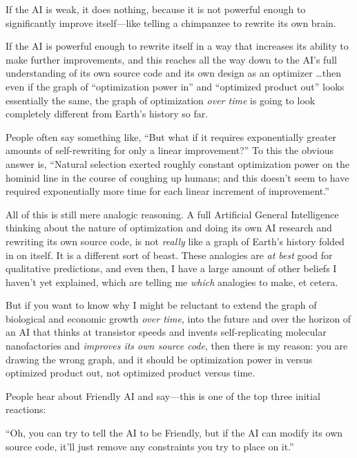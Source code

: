 {
 If the AI is weak, it does nothing, because it is not powerful
enough to significantly improve itself---like telling a chimpanzee to
rewrite its own brain.}

{
 If the AI is powerful enough to rewrite itself in a way that
increases its ability to make further improvements, and this reaches
all the way down to the AI's full understanding of its
own source code and its own design as an optimizer \ldots then even if
the graph of ``optimization power
in'' and ``optimized product
out'' looks essentially the same, the graph of
optimization \textit{over time} is going to look completely different
from Earth's history so far.}

{
 People often say something like, ``But what if it
requires exponentially greater amounts of self-rewriting for only a
linear improvement?'' To this the obvious answer is,
``Natural selection exerted roughly constant
optimization power on the hominid line in the course of coughing up
humans; and this doesn't seem to have required
exponentially more time for each linear increment of
improvement.''}

{
 All of this is still mere analogic reasoning. A full Artificial
General Intelligence thinking about the nature of optimization and
doing its own AI research and rewriting its own source code, is not
\textit{really} like a graph of Earth's history folded
in on itself. It is a different sort of beast. These analogies are
\textit{at best} good for qualitative predictions, and even then, I
have a large amount of other beliefs I haven't yet
explained, which are telling me \textit{which} analogies to make, et
cetera.}

{
 But if you want to know why I might be reluctant to extend the
graph of biological and economic growth \textit{over time}, into the
future and over the horizon of an AI that thinks at transistor speeds
and invents self-replicating molecular nanofactories and
\textit{improves its own source code}, then there is my reason: you are
drawing the wrong graph, and it should be optimization power in versus
optimized product out, not optimized product versus time.}

\myendsectiontext


{
 People hear about Friendly AI and say---this is one of the top
three initial reactions: }

{
 ``Oh, you can try to tell the AI to be Friendly,
but if the AI can modify its own source code, it'll
just remove any constraints you try to place on
it.''}

